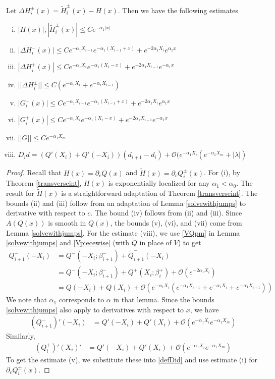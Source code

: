 \documentclass[thesis.tex]{subfiles}
\begin{document}
\begin{lemma}\label{stabestimateslemma}
Let $\Delta H_i^\pm(x) = \tilde{H}_i^\pm(x) - H(x)$. Then we have the following estimates
\begin{enumerate}[(i)]
\item $|H(x)|, |\tilde{H}_i^\pm(x)| \leq C e^{-\alpha_1 |x|}$
\item $|\Delta H_i^-(x)| \leq C e^{-\alpha_1 X_{i-1}} e^{-\alpha_1(X_{i-1} + x) } + e^{-2 \alpha_1 X_i} e^{\alpha_1 x}$
\item $|\Delta H_i^+(x)| \leq C e^{-\alpha_1 X_i} e^{-\alpha_1(X_i - x) } + e^{-2 \alpha_1 X_{i-1}} e^{-\alpha_1 x}$
\item $||\Delta H_i^\pm|| \leq C(e^{-\alpha_1 X_i} + e^{-\alpha_1 X_{i-1}} )$
\item $|G_i^-(x)| \leq C e^{-\alpha_1 X_{i-1}} e^{-\alpha_1(X_{i-1} + x) } + e^{-2 \alpha_1 X_i} e^{\alpha_1 x}$
\item $|G_i^+(x)| \leq C e^{-\alpha_1 X_i} e^{-\alpha_1(X_i - x) } + e^{-2 \alpha_1 X_{i-1}} e^{-\alpha_1 x}$
\item $||G|| \leq C e^{-\alpha_1 X_m}$
\item $D_i d = ( Q'(X_i) + Q'(-X_i))(d_{i+1} - d_i ) + \mathcal{O} ( e^{-\alpha_1 X_i} (e^{-\alpha_1 X_m} + |\lambda| )$
\end{enumerate}
\begin{proof}
Recall that $H(x) = \partial_c Q(x)$ and $\tilde{H}(x) = \partial_c Q_i^\pm(x)$. For (i), by Theorem \ref{transverseint}, $H(x)$ is exponentially localized for any $\alpha_1 < \alpha_0$. The result for $\tilde{H}(x)$ is a straightforward adaptation of Theorem \ref{transverseint}. The bounds (ii) and (iii) follow from an adaptation of Lemma \ref{solvewithjumps} to derivative with respect to $c$. The bound (iv) follows from (ii) and (iii). Since $A(Q(x))$ is smooth in $Q(x)$, the bounds (v), (vi), and (vii) come from Lemma \ref{solvewithjumps}. For the estimate (viii), we use \eqref{VQpm} in Lemma \ref{solvewithjumps} and \eqref{Vpiecewise} (with $\tilde{Q}$ in place of $V$) to get
\begin{align*}
Q_{i+1}^-(-X_i) &= Q^-(-X_i; \beta_{i+1}^-) + \tilde{Q}_{i+1}^-(-X_i) \\
&= Q^-(-X_i; \beta_{i+1} ^-) + Q^+(X_i; \beta_i^+) + \mathcal{O}(e^{-2 \alpha_1 X_i}) \\
&= Q(-X_i) + Q(X_i) 
+ \mathcal{O}(e^{-\alpha_1 X_i}(e^{-\alpha_1 X_{i-1}}+e^{-\alpha_1 X_i}+e^{-\alpha_1 X_{i+1}}))
\end{align*}
We note that $\alpha_1$ corresponds to $\alpha$ in that lemma. Since the bounds \ref{solvewithjumps} also apply to derivatives with respect to $x$, we have
\begin{align*}
(Q_{i+1}^-)'(-X_i) &= Q'(-X_i) + Q'(X_i) + \mathcal{O}(e^{-\alpha_1 X_i}e^{-\alpha_1 X_m})
\end{align*}
Similarly,
\begin{align*}
(Q_i^+)'(X_i)' &= Q'(-X_i) + Q'(X_i) + \mathcal{O}(e^{-\alpha_1 X_i}e^{-\alpha_1 X_m})
\end{align*}
To get the estimate (v), we substitute these into \cref{defDid} and use estimate (i) for $\partial_c Q_i^\pm(x)$.
\end{proof}
\end{lemma}
\end{document}
